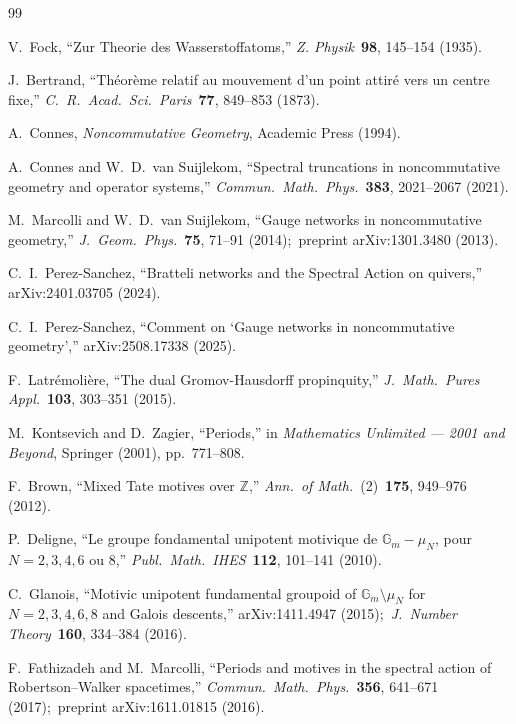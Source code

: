 \documentclass[11pt,a4paper]{article}
\newcommand{\Z}{\mathbb{Z}}
\begin{document}
\begin{thebibliography}{99}

V.~Fock, ``Zur Theorie des Wasserstoffatoms,''
\textit{Z. Physik}~\textbf{98}, 145--154 (1935).

J.~Bertrand, ``Th\'eor\`eme relatif au mouvement d'un point attir\'e
vers un centre fixe,''
\textit{C.~R.\ Acad.\ Sci.\ Paris}~\textbf{77}, 849--853 (1873).

A.~Connes, \textit{Noncommutative Geometry}, Academic Press (1994).

A.~Connes and W.~D.~van Suijlekom, ``Spectral truncations in
noncommutative geometry and operator systems,''
\textit{Commun.\ Math.\ Phys.}~\textbf{383}, 2021--2067 (2021).

M.~Marcolli and W.~D.~van Suijlekom, ``Gauge networks in
noncommutative geometry,''
\textit{J.\ Geom.\ Phys.}~\textbf{75}, 71--91 (2014);\ preprint
arXiv:1301.3480 (2013).

C.~I.~Perez-Sanchez, ``Bratteli networks and the Spectral Action on
quivers,'' arXiv:2401.03705 (2024).

C.~I.~Perez-Sanchez, ``Comment on `Gauge networks in noncommutative
geometry','' arXiv:2508.17338 (2025).

F.~Latr\'emoli\`ere, ``The dual Gromov-Hausdorff propinquity,''
\textit{J.\ Math.\ Pures Appl.}~\textbf{103}, 303--351 (2015).

M.~Kontsevich and D.~Zagier, ``Periods,'' in \textit{Mathematics
Unlimited --- 2001 and Beyond}, Springer (2001), pp.~771--808.

F.~Brown, ``Mixed Tate motives over $\Z$,''
\textit{Ann.\ of Math.}~(2)~\textbf{175}, 949--976 (2012).

P.~Deligne, ``Le groupe fondamental unipotent motivique de
$\mathbb{G}_m - \mu_N$, pour $N = 2, 3, 4, 6$ ou $8$,''
\textit{Publ.\ Math.\ IHES}~\textbf{112}, 101--141 (2010).

C.~Glanois, ``Motivic unipotent fundamental groupoid of
$\mathbb{G}_m \setminus \mu_N$ for $N = 2, 3, 4, 6, 8$ and Galois
descents,'' arXiv:1411.4947 (2015);\ \textit{J.\ Number Theory}~\textbf{160},
334--384 (2016).

F.~Fathizadeh and M.~Marcolli, ``Periods and motives in the spectral
action of Robertson--Walker spacetimes,''
\textit{Commun.\ Math.\ Phys.}~\textbf{356}, 641--671 (2017);\ preprint
arXiv:1611.01815 (2016).


\end{thebibliography}
\end{document}
